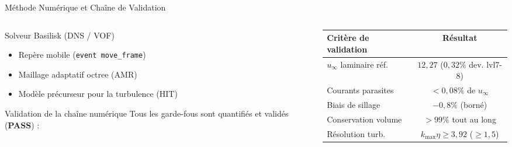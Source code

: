 \documentclass[11pt,aspectratio=169]{beamer}
\begin{document}
\begin{frame}{Méthode Numérique et Chaîne de Validation}
  \begin{columns}[T]
    \begin{column}{0.5\textwidth}
      \begin{block}{Solveur Basilisk (DNS / VOF)}
        \begin{itemize}
          \item Repère mobile (\texttt{event move\_frame})
          \item Maillage adaptatif octree (AMR)
          \item Modèle précurseur pour la turbulence (HIT)
        \end{itemize}
      \end{block}

      \begin{alertblock}{Validation de la chaîne numérique}
        Tous les garde-fous sont quantifiés et validés (\textbf{PASS}) :
      \end{alertblock}
    \end{column}

    \begin{column}{0.48\textwidth}
      \small
      \begin{table}
        \centering
        \renewcommand{\arraystretch}{1.2}
        \begin{tabular}{lc}
          \toprule
          \textbf{Critère de validation} & \textbf{Résultat} \\
          \midrule
          $u_\infty$ laminaire réf. & $12{,}27$ ($0{,}32\%$ dev. lvl7-8) \\
          Courants parasites & $< 0{,}08\%$ de $u_\infty$ \\
          Biais de sillage & $-0{,}8\%$ (borné) \\
          Conservation volume & $> 99\%$ tout au long \\
          Résolution turb. & $k_{\max}\eta \ge 3{,}92$ ($\ge 1{,}5$) \\
          \bottomrule
        \end{tabular}
      \end{table}
    \end{column}
  \end{columns}
\end{frame}
\end{document}
